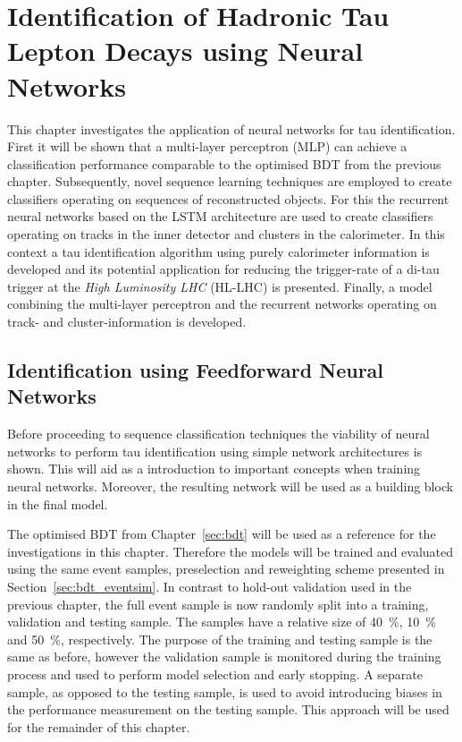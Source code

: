 \chapter{Identification of Hadronic Tau Lepton Decays using Neural Networks}
\label{sec:rnn}

This chapter investigates the application of neural networks for tau
identification. First it will be shown that a multi-layer perceptron (MLP) can
achieve a classification performance comparable to the optimised BDT from the
previous chapter. Subsequently, novel sequence learning techniques are employed
to create classifiers operating on sequences of reconstructed objects. For this
the recurrent neural networks based on the LSTM architecture are used to create
classifiers operating on tracks in the inner detector and clusters in the
calorimeter. In this context a tau identification algorithm using purely
calorimeter information is developed and its potential application for reducing
the trigger-rate of a di-tau trigger at the \emph{High Luminosity LHC} (HL-LHC)
is presented. Finally, a model combining the multi-layer perceptron and the
recurrent networks operating on track- and cluster-information is developed.

\section{Identification using Feedforward Neural Networks}
\label{sec:ffnn_id}

Before proceeding to sequence classification techniques the viability of neural
networks to perform tau identification using simple network architectures is
shown. This will aid as a introduction to important concepts when training
neural networks. Moreover, the resulting network will be used as a building
block in the final model.

The optimised BDT from Chapter~\ref{sec:bdt} will be used as a reference for the
investigations in this chapter. Therefore the models will be trained and
evaluated using the same event samples, preselection and reweighting scheme
presented in Section~\ref{sec:bdt_eventsim}. In contrast to hold-out validation
used in the previous chapter, the full event sample is now randomly split into a
training, validation and testing sample. The samples have a relative size of
\SI{40}{\percent}, \SI{10}{\percent} and \SI{50}{\percent}, respectively. The
purpose of the training and testing sample is the same as before, however the
validation sample is monitored during the training process and used to perform
model selection and early stopping. A separate sample, as opposed to the testing
sample, is used to avoid introducing biases in the performance measurement on
the testing sample. This approach will be used for the remainder of this
chapter.

